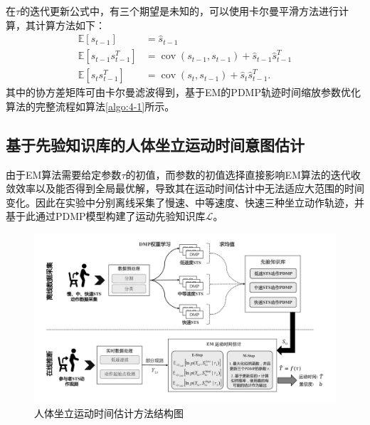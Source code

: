在$\tau$的迭代更新公式中，有三个期望是未知的，可以使用卡尔曼平滑方法进行计算\cite{bishopPatternRecognitionMachine2006}，其计算方法如下：
\begin{equation}
    \begin{aligned}
    \mathbb{E}\left[s_{t-1}\right] & =\hat{s}_{t-1} \\
    \mathbb{E}\left[s_{t-1} s_{t-1}^T\right] & =\operatorname{cov}\left(s_{t-1}, s_{t-1}\right)+\hat{s}_{t-1} \hat{s}_{t-1}^T \\
    \mathbb{E}\left[s_t s_{t-1}^T\right] & =\operatorname{cov}\left(s_t, s_{t-1}\right)+\hat{s}_t \hat{s}_{t-1}^T .
    \end{aligned}
    \label{eq:4-36}
\end{equation}
其中的协方差矩阵可由卡尔曼滤波得到，基于EM的PDMP轨迹时间缩放参数优化算法的完整流程如算法\ref{algo:4-1}所示。

\subsection{基于先验知识库的人体坐立运动时间意图估计}
由于EM算法需要给定参数$\tau$的初值，而参数的初值选择直接影响EM算法的迭代收敛效率以及能否得到全局最优解，导致其在运动时间估计中无法适应大范围的时间变化。因此在实验中分别离线采集了慢速、中等速度、快速三种坐立动作轨迹，并基于此通过PDMP模型构建了运动先验知识库$\mathscr{L}$。

\begin{figure}[htb]
    \centering\includegraphics[width=1\textwidth]{figures/4-Fig-3.pdf}
    \caption{人体坐立运动时间估计方法结构图}
    \label{fig:4-3}
\end{figure}

